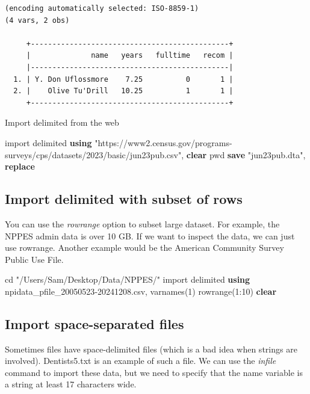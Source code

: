 \documentclass[
]{book}
\newenvironment{Shaded}{\begin{snugshade}}{\end{snugshade}}
\newcommand{\KeywordTok}[1]{\textcolor[rgb]{0.13,0.29,0.53}{\textbf{#1}}}
\newcommand{\NormalTok}[1]{#1}
\newcommand{\StringTok}[1]{\textcolor[rgb]{0.31,0.60,0.02}{#1}}
\begin{document}
\begin{verbatim}
(encoding automatically selected: ISO-8859-1)
(4 vars, 2 obs)

     +----------------------------------------------+
     |              name   years   fulltime   recom |
     |----------------------------------------------|
  1. | Y. Don Uflossmore    7.25          0       1 |
  2. |    Olive Tu'Drill   10.25          1       1 |
     +----------------------------------------------+
\end{verbatim}

Import delimited from the web

\begin{Shaded}
\begin{Highlighting}[]
\NormalTok{import delimited }\KeywordTok{using} \StringTok{"https://www2.census.gov/programs{-}surveys/cps/datasets/2023/basic/jun23pub.csv"}\NormalTok{, }\KeywordTok{clear}
\NormalTok{pwd}
\KeywordTok{save} \StringTok{"jun23pub.dta"}\NormalTok{, }\KeywordTok{replace}
\end{Highlighting}
\end{Shaded}

\subsection{Import delimited with subset of rows}\label{import-delimited-with-subset-of-rows}

You can use the \emph{rowrange} option to subset large dataset. For example, the NPPES admin data is over 10 GB. If we want to inspect the data, we can just use rowrange. Another example would be the American Community Survey Public Use File.

\begin{Shaded}
\begin{Highlighting}[]
\NormalTok{cd }\StringTok{"/Users/Sam/Desktop/Data/NPPES/"}
\NormalTok{import delimited }\KeywordTok{using}\NormalTok{ npidata\_pfile\_20050523{-}20241208.csv, varnames(1) rowrange(1:10) }\KeywordTok{clear}
\end{Highlighting}
\end{Shaded}

\subsection{Import space-separated files}\label{import-space-separated-files}

Sometimes files have space-delimited files (which is a bad idea when strings are involved). Dentists5.txt is an example of such a file. We can use the \emph{infile} command to import these data, but we need to specify that the name variable is a string at least 17 characters wide.
\end{document}
